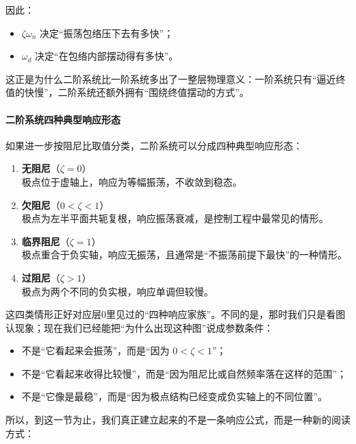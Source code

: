 \documentclass[
  11pt]{article}
\providecommand{\tightlist}{%
  \setlength{\itemsep}{0pt}\setlength{\parskip}{0pt}}
\begin{document}
因此：

\begin{itemize}
\tightlist
\item
  \(\zeta\omega_n\) 决定``振荡包络压下去有多快''；
\item
  \(\omega_d\) 决定``在包络内部摆动得有多快''。
\end{itemize}

这正是为什么二阶系统比一阶系统多出了一整层物理意义：一阶系统只有``逼近终值的快慢''，二阶系统还额外拥有``围绕终值摆动的方式''。

\paragraph{二阶系统四种典型响应形态}\label{ux4e8cux9636ux7cfbux7edfux56dbux79cdux5178ux578bux54cdux5e94ux5f62ux6001}

如果进一步按阻尼比取值分类，二阶系统可以分成四种典型响应形态：

\begin{enumerate}
\def\labelenumi{\arabic{enumi}.}
\tightlist
\item
  \textbf{无阻尼}（\(\zeta=0\)）\\
  极点位于虚轴上，响应为等幅振荡，不收敛到稳态。
\item
  \textbf{欠阻尼}（\(0<\zeta<1\)）\\
  极点为左半平面共轭复根，响应振荡衰减，是控制工程中最常见的情形。
\item
  \textbf{临界阻尼}（\(\zeta=1\)）\\
  极点重合于负实轴，响应无振荡，且通常是``不振荡前提下最快''的一种情形。
\item
  \textbf{过阻尼}（\(\zeta>1\)）\\
  极点为两个不同的负实根，响应单调但较慢。
\end{enumerate}

这四类情形正好对应层0里见过的``四种响应家族''。不同的是，那时我们只是看图认现象；现在我们已经能把``为什么出现这种图''说成参数条件：

\begin{itemize}
\tightlist
\item
  不是``它看起来会振荡''，而是``因为 \(0<\zeta<1\)''；
\item
  不是``它看起来收得比较慢''，而是``因为阻尼比或自然频率落在这样的范围''；
\item
  不是``它像是最稳''，而是``因为极点结构已经变成负实轴上的不同位置''。
\end{itemize}

所以，到这一节为止，我们真正建立起来的不是一条响应公式，而是一种新的阅读方式：
\end{document}
